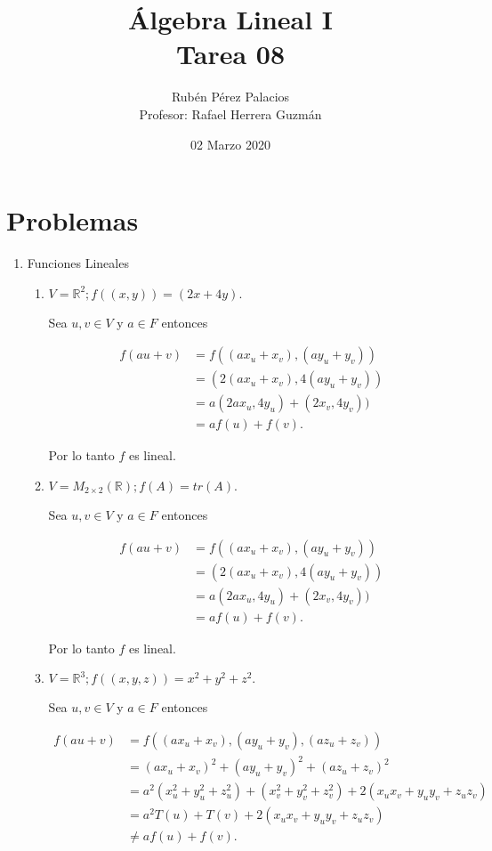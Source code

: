 \documentclass[letterpaper]{article}
\title{Álgebra Lineal I\\Tarea 08}
\author{Rubén Pérez Palacios\\Profesor: Rafael Herrera Guzmán}
\date{02 Marzo 2020}
\theoremstyle{definition}
\theoremstyle{lemathm}
\theoremstyle{lemademthm}
\newcommand{\R}{\mathbb{R}}
\begin{document}
	\maketitle
    
    \section*{Problemas}

    \begin{enumerate}
        
        \item Funciones Lineales
		
		\begin{enumerate}
			\item $V = \R^2; f((x,y)) = (2x+4y).$
			
			Sea $u,v \in V$ y $a \in F$ entonces

			\begin{align*}
				f(au + v) &= f((ax_u + x_v), (ay_u + y_v))\\
				&= (2(ax_u + x_v), 4(ay_u + y_v))\\
				&= a(2ax_u, 4y_u) + (2x_v, 4y_v))\\
				&= af(u) + f(v).
			\end{align*}

			Por lo tanto $f$ es lineal.

			\item $V = M_{2\times2}(\R); f(A) = tr(A).$
			
			Sea $u,v \in V$ y $a \in F$ entonces

			\begin{align*}
				f(au + v) &= f((ax_u + x_v), (ay_u + y_v))\\
				&= (2(ax_u + x_v), 4(ay_u + y_v))\\
				&= a(2ax_u, 4y_u) + (2x_v, 4y_v))\\
				&= af(u) + f(v).	
			\end{align*}

			Por lo tanto $f$ es lineal.

			\item $V = \R^3; f((x,y,z)) = x^2+y^2+z^2.$
			
			Sea $u,v \in V$ y $a \in F$ entonces

			\begin{align*}
				f(au + v) &= f((ax_u + x_v), (ay_u + y_v), (az_u + z_v))\\
				&= (ax_u + x_v)^2 + (ay_u + y_v)^2 + (az_u + z_v)^2\\
				&= a^2(x_u^2 + y_u^2 + z_u^2) + (x_v^2 + y_v^2 + z_v^2) + 2(x_ux_v + y_uy_v + z_uz_v)\\
				&= a^2T(u) + T(v) + 2(x_ux_v + y_uy_v + z_uz_v)\\
				&\neq af(u) + f(v).
			\end{align*}


\end{enumerate}
\end{enumerate}
\end{document}
